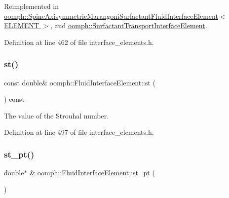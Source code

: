 Reimplemented in \hyperlink{classoomph_1_1SpineAxisymmetricMarangoniSurfactantFluidInterfaceElement_a7312e78a1b5449ea2ff6d856a4fd9c46}{oomph\+::\+Spine\+Axisymmetric\+Marangoni\+Surfactant\+Fluid\+Interface\+Element$<$ E\+L\+E\+M\+E\+N\+T $>$}, and \hyperlink{classoomph_1_1SurfactantTransportInterfaceElement_a1710057c610ccccc06ef41f34f086aae}{oomph\+::\+Surfactant\+Transport\+Interface\+Element}.



Definition at line 462 of file interface\+\_\+elements.\+h.

\mbox{\label{classoomph_1_1FluidInterfaceElement_a0c55c0e3cff597363ecb9ab0869c0015}} 
\subsubsection{\texorpdfstring{st()}{st()}}
{\footnotesize\ttfamily const double\& oomph\+::\+Fluid\+Interface\+Element\+::st (\begin{DoxyParamCaption}{ }\end{DoxyParamCaption}) const\hspace{0.3cm}{\ttfamily [inline]}}



The value of the Strouhal number. 



Definition at line 497 of file interface\+\_\+elements.\+h.

\mbox{\label{classoomph_1_1FluidInterfaceElement_a3fa462bb0ff807cf655ba02b35c1ccb4}} 
\subsubsection{\texorpdfstring{st\+\_\+pt()}{st\_pt()}}
{\footnotesize\ttfamily double$\ast$ \& oomph\+::\+Fluid\+Interface\+Element\+::st\+\_\+pt (\begin{DoxyParamCaption}{ }\end{DoxyParamCaption})\hspace{0.3cm}{\ttfamily [inline]}}



